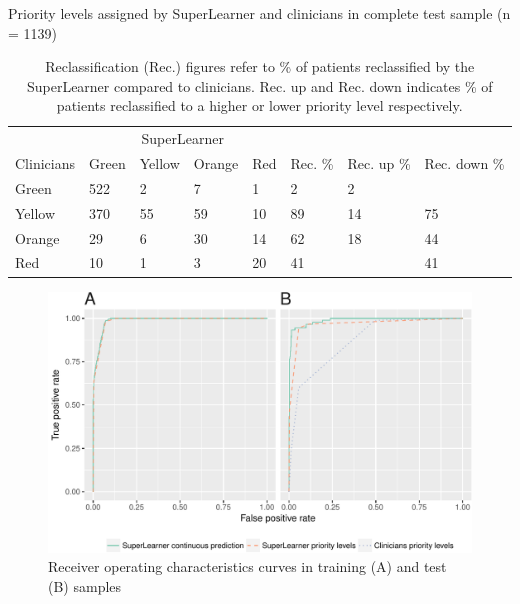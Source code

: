 \documentclass[10pt,letterpaper]{article}\usepackage[]{graphicx}\usepackage[]{color}
\begin{document}
\begin{table}[ht]
\centering
\caption{Priority levels assigned by SuperLearner and clinicians in complete test sample (n = 1139)} 
\label{tab:reclass_all}
\begin{tabular}{llllllll}
  \hline
  & \multicolumn{4}{c}{SuperLearner} \\
 Clinicians & Green & Yellow & Orange & Red & Rec. \% & Rec. up \% & Rec. down \% \\
 \hline
Green & 522 & 2 & 7 & 1 & 2 & 2 &  \\ 
  Yellow & 370 & 55 & 59 & 10 & 89 & 14 & 75 \\ 
  Orange & 29 & 6 & 30 & 14 & 62 & 18 & 44 \\ 
  Red & 10 & 1 & 3 & 20 & 41 &  & 41 \\ 
   \hline
\end{tabular}
\caption*{Reclassification (Rec.) figures refer to \% of patients reclassified by the SuperLearner compared to clinicians. Rec. up and Rec. down indicates \% of patients reclassified to a higher or lower priority level respectively.} 
\end{table}


\begin{figure}
  \caption{Receiver operating characteristics curves in training (A) and test
    (B) samples}
  \label{fig:roc_plot}
  \includegraphics[width=\textwidth]{roc_plot.pdf}
\end{figure}
\end{document}
